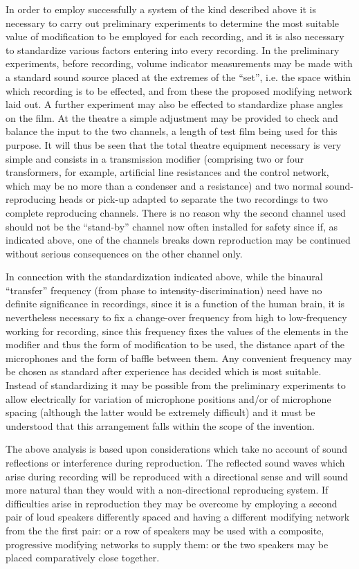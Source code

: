 \documentclass[11pt]{article}
\begin{document}
\begin{multicols*}{2}
In order to employ successfully a system of the kind described above it is necessary to carry out preliminary experiments to determine the most suitable value of modification to be employed for each recording, and it is also necessary to standardize various factors entering into every recording. In the preliminary experiments, before recording, volume indicator measurements may be made with a standard sound source placed at the extremes of the “set”, i.e. the space within which recording is to be effected, and from these the proposed modifying network laid out. A further experiment may also be effected to standardize phase angles on the film. At the theatre a simple adjustment may be provided to check and balance the input to the two channels, a length of test film being used for this purpose. It will thus be seen that the total theatre equipment necessary is very simple and consists in a transmission modifier (comprising two or four transformers, for example, artificial line resistances and the control network, which may be no more than a condenser and a resistance) and two normal sound-reproducing heads or pick-up adapted to separate the two recordings to two complete reproducing channels. There is no reason why the second channel used should not be the “stand-by” channel now often installed for safety since if, as indicated above, one of the channels breaks down reproduction may be continued without serious consequences on the other channel only.

In connection with the standardization indicated above, while the binaural “transfer” frequency (from phase to intensity-discrimination) need have no definite significance in recordings, since it is a function of the human brain, it is nevertheless necessary to fix a change-over frequency from high to low-frequency working for recording, since this frequency fixes the values of the elements in the modifier and thus the form of modification to be used, the distance apart of the microphones and the form of baffle between them. Any convenient frequency may be chosen as standard after experience has decided which is most suitable. Instead of standardizing it may be possible from the preliminary experiments to allow electrically for variation of microphone positions and/or of microphone spacing (although the latter would be extremely difficult) and it must be understood that this arrangement falls within the scope of the invention.

The above analysis is based upon considerations which take no account of sound reflections or interference during reproduction. The reflected sound waves which arise during recording will be reproduced with a directional sense and will sound more natural than they would with a non-directional reproducing system. If difficulties arise in reproduction they may be overcome by employing a second pair of loud speakers differently spaced and having a different modifying network from the the first pair: or a row of speakers may be used with a composite, progressive modifying networks to supply them: or the two speakers may be placed comparatively close together.


\end{multicols*}
\end{document}
